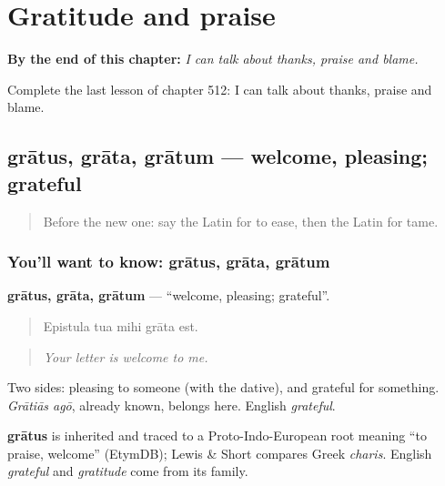 
\chapter{Gratitude and praise}
\label{ch:la-gratitude-and-praise}

\begin{chapteropening}
\textbf{By the end of this chapter:} \emph{I can talk about thanks, praise and blame.}

Complete the last lesson of chapter 512: I can talk about thanks, praise and blame.
\end{chapteropening}

\section[grātus, grāta, grātum]{grātus, grāta, grātum — welcome, pleasing; grateful}

\label{lesson:LA-C512-gratus}



\begin{quote}
Before the new one: say the Latin for to ease, then the Latin for tame.
\end{quote}

\subsection*{You'll want to know: grātus, grāta, grātum}
\textbf{grātus, grāta, grātum} — \textquotedblleft{}welcome, pleasing; grateful\textquotedblright{}.

\begin{quote}
Epistula tua mihi grāta est.
\end{quote}

\begin{quote}
\emph{Your letter is welcome to me.}
\end{quote}

Two sides: pleasing to someone (with the dative), and grateful for something. \emph{Grātiās agō}, already known, belongs here. English \emph{grateful}.

\begin{cousinweb}
\textbf{grātus} is inherited and traced to a Proto-Indo-European root meaning \textquotedblleft{}to praise, welcome\textquotedblright{} (EtymDB); Lewis \& Short compares Greek \emph{charis}. English \emph{grateful} and \emph{gratitude} come from its family.
\end{cousinweb}

